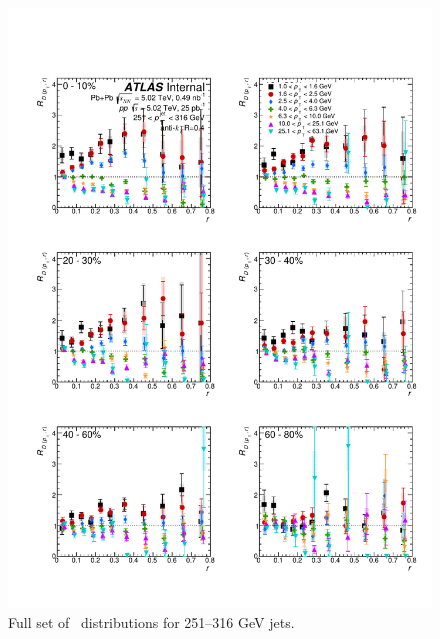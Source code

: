 \begin{figure}[h]
\includegraphics[width=1.0\textwidth]{figures/results/RDpT_dR_jet10.pdf}
\caption{Full set of \RDptr\ distributions for 251--316 GeV jets.}
\label{fig:fullset_drtr_j10}
\end{figure}
